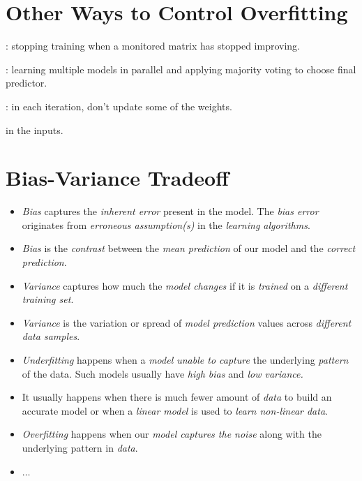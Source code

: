 \documentclass[
	title={Linear Regression}
]{cs584notes}
\begin{document}
\section{Other Ways to Control Overfitting}\label{sec:other-ways-to-control-overfitting}
\begin{description}[font=\emph]
	\item[Early-stopping]: stopping training when a monitored matrix has stopped improving.
	\item[Bagging]: learning multiple models in parallel and applying majority voting to choose final predictor.
	\item[Dropout]: in each iteration, don't update some of the weights.
	\item[Injecting noise] in the inputs.
\end{description}

\section{Bias-Variance Tradeoff}\label{sec:bias-variance-tradeoff}
\begin{itemize}
	\item \emph{Bias} captures the \emph{inherent error} present in the model.
	The \emph{bias error} originates from \emph{erroneous assumption(s)} in the \emph{learning algorithms}.
	\item \emph{Bias} is the \emph{contrast} between the \emph{mean prediction} of our model and the \emph{correct prediction}.
	\item \emph{Variance} captures how much the \emph{model changes} if it is \emph{trained} on a \emph{different training set}.
	\item \emph{Variance} is the variation or spread of \emph{model prediction} values across \emph{different data samples}.
	\item \emph{Underfitting} happens when a \emph{model unable to capture} the underlying \emph{pattern} of the data.
	Such models usually have \emph{high bias} and \emph{low variance.}
	\item It usually happens when there is much fewer amount of \emph{data} to build an accurate model or when a \emph{linear model} is used to \emph{learn non-linear data}.
	\item \emph{Overfitting} happens when our \emph{model captures the noise} along with the underlying pattern in \emph{data}.
	\item $\dots$
\end{itemize}
\end{document}
